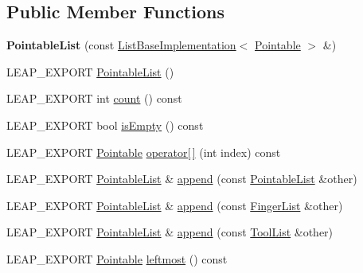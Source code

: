\subsection*{Public Member Functions}
\begin{DoxyCompactItemize}
\item 
\hypertarget{class_leap_1_1_pointable_list_afeeb15c12648df910dbd27c120b4b649}{{\bfseries Pointable\+List} (const \hyperlink{class_leap_1_1_list_base_implementation}{List\+Base\+Implementation}$<$ \hyperlink{class_leap_1_1_pointable}{Pointable} $>$ \&)}\label{class_leap_1_1_pointable_list_afeeb15c12648df910dbd27c120b4b649}

\item 
L\+E\+A\+P\+\_\+\+E\+X\+P\+O\+R\+T \hyperlink{class_leap_1_1_pointable_list_ad8ba234f2a9491dd9c1062432e40ebf5}{Pointable\+List} ()
\item 
L\+E\+A\+P\+\_\+\+E\+X\+P\+O\+R\+T int \hyperlink{class_leap_1_1_pointable_list_a3a8aabe61fd964c0b60d18b743670c54}{count} () const 
\item 
L\+E\+A\+P\+\_\+\+E\+X\+P\+O\+R\+T bool \hyperlink{class_leap_1_1_pointable_list_aed63f1f0bb19495698686364f169c131}{is\+Empty} () const 
\item 
L\+E\+A\+P\+\_\+\+E\+X\+P\+O\+R\+T \hyperlink{class_leap_1_1_pointable}{Pointable} \hyperlink{class_leap_1_1_pointable_list_a2a0e9f1b2789028c7d958ecc197ced22}{operator\mbox{[}$\,$\mbox{]}} (int index) const 
\item 
L\+E\+A\+P\+\_\+\+E\+X\+P\+O\+R\+T \hyperlink{class_leap_1_1_pointable_list}{Pointable\+List} \& \hyperlink{class_leap_1_1_pointable_list_a415fee35b60e79f69a440096d6818d75}{append} (const \hyperlink{class_leap_1_1_pointable_list}{Pointable\+List} \&other)
\item 
L\+E\+A\+P\+\_\+\+E\+X\+P\+O\+R\+T \hyperlink{class_leap_1_1_pointable_list}{Pointable\+List} \& \hyperlink{class_leap_1_1_pointable_list_a8da39b0c202e3ade7aad666dcceddfdf}{append} (const \hyperlink{class_leap_1_1_finger_list}{Finger\+List} \&other)
\item 
L\+E\+A\+P\+\_\+\+E\+X\+P\+O\+R\+T \hyperlink{class_leap_1_1_pointable_list}{Pointable\+List} \& \hyperlink{class_leap_1_1_pointable_list_a091f0c1a7030f5f91701dd54f73a98de}{append} (const \hyperlink{class_leap_1_1_tool_list}{Tool\+List} \&other)
\item 
L\+E\+A\+P\+\_\+\+E\+X\+P\+O\+R\+T \hyperlink{class_leap_1_1_pointable}{Pointable} \hyperlink{class_leap_1_1_pointable_list_a769d774ccf140e4b597f9d03c64ade09}{leftmost} () const 
\item 

\end{DoxyCompactItemize}
